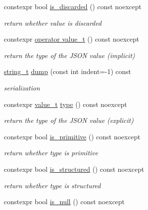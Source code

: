 \begin{DoxyCompactItemize}
constexpr bool \hyperlink{classnlohmann_1_1basic__json_a1002d187e05b5323bda5de124cbe95a8}{is\-\_\-discarded} () const noexcept
\begin{DoxyCompactList}\small\item\em return whether value is discarded \end{DoxyCompactList}\item 
constexpr \hyperlink{classnlohmann_1_1basic__json_a02397f02bb1182bf1e1bc7ecf7f2c227}{operator value\-\_\-t} () const noexcept
\begin{DoxyCompactList}\small\item\em return the type of the J\-S\-O\-N value (implicit) \end{DoxyCompactList}\item 
\hyperlink{classnlohmann_1_1basic__json_ab63e618bbb0371042b1bec17f5891f42}{string\-\_\-t} \hyperlink{classnlohmann_1_1basic__json_a805e3f3a2f374da0e14942eec7400e40}{dump} (const int indent=-\/1) const 
\begin{DoxyCompactList}\small\item\em serialization \end{DoxyCompactList}\item 
constexpr \hyperlink{classnlohmann_1_1basic__json_a231b02148577b69a154b2ce2c87a5522}{value\-\_\-t} \hyperlink{classnlohmann_1_1basic__json_a5d466b240d0ba9f648d7fd4ff42359f5}{type} () const noexcept
\begin{DoxyCompactList}\small\item\em return the type of the J\-S\-O\-N value (explicit) \end{DoxyCompactList}\item 
constexpr bool \hyperlink{classnlohmann_1_1basic__json_adcd6086bac286854d5cc8b7f84d74a49}{is\-\_\-primitive} () const noexcept
\begin{DoxyCompactList}\small\item\em return whether type is primitive \end{DoxyCompactList}\item 
constexpr bool \hyperlink{classnlohmann_1_1basic__json_a873f4bff2f2a83f68fc1b5341ebdd446}{is\-\_\-structured} () const noexcept
\begin{DoxyCompactList}\small\item\em return whether type is structured \end{DoxyCompactList}\item 
constexpr bool \hyperlink{classnlohmann_1_1basic__json_a8abdfc0d6e051f6fa29d49da57bce631}{is\-\_\-null} () const noexcept

\end{DoxyCompactItemize}
